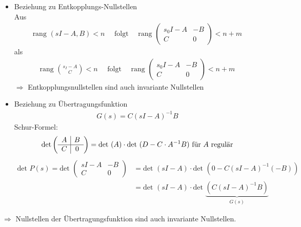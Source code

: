 \documentclass[ngerman]{tudscrreprt}
\begin{document}
\begin{itemize}
\item Beziehung zu Entkopplungs-Nullstellen \\
Aus \begin{align*}
\text{rang }(sI-A,B) < n \quad \text{ folgt }\quad \text{rang }\begin{pmatrix}s_0I-A& -B\\ C&0\end{pmatrix} < n+m  
\end{align*} 
als \begin{align*}
\text{rang }\binom{s_I -A}{C} < n \quad \text{ folgt } \quad \text{rang }\begin{pmatrix} s_0I-A & -B\\ C & 0 \end{pmatrix} < n+m
\end{align*}
$\Rightarrow$ Entkopplungsnullstellen sind auch invariante Nullstellen
\item Beziehung zu Übertragungsfunktion \begin{align*}
G(s) = C(sI-A)^{-1}B
\end{align*}
Schur-Formel: \begin{align*}
\text{det}\left(\begin{array}{ c | c } 
A & B\\ \hline 
C & 0
\end{array}\right) = \text{det }(A)\cdot \text{det }(D-C\cdot A^{-1}B) \text{  für $A$ regulär}
\end{align*}
\begin{align*}
\text{det }P(s) = \text{det }\begin{pmatrix}sI-A & -B\\ C & 0\end{pmatrix} &=\text{det }(sI-A)\cdot \text{det }(0-C(sI-A)^{-1}(-B))\\ 
&= \text{det }(sI-A)\cdot \text{det }\underbrace{(C(sI-A)^{-1}B)}_{G(s)}
\end{align*}
\end{itemize}
$\Rightarrow$ Nullstellen der Übertragungsfunktion sind auch invariante Nullstellen.
\end{document}
